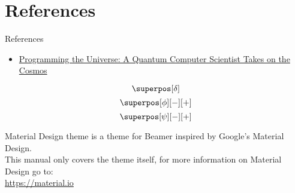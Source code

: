 \documentclass[aspectratio=43]{beamer}
\begin{document}
\begin{frame}{\qp}
\begin{card}
    \centering{}
\end{card}
\pagenumber
\end{frame}



\section{References}
\begin{frame}{References}
\begin{card}
    \begin{itemize}
        \item \href{https://www.goodreads.com/book/show/331680.Programming_the_Universe}{Programming the Universe: A Quantum Computer Scientist Takes on the Cosmos}
    \end{itemize}
\end{card}
\end{frame}



\begin{frame}
	\begin{equation}
	    \superpos[\delta]
	\end{equation}
	\begin{equation}
		\superpos[\phi][-][+]
	\end{equation}
	\begin{equation}
		\plusminus
	\end{equation}
	\par
\end{frame}

\begin{frame}
	\begin{card}
		Material Design theme is a theme for Beamer inspired by Google's Material Design. \\[5mm]
		This manual only covers the theme itself, for more information on Material Design go to:
		\\\url{https://material.io}
	\end{card}
\end{frame}
\end{document}
